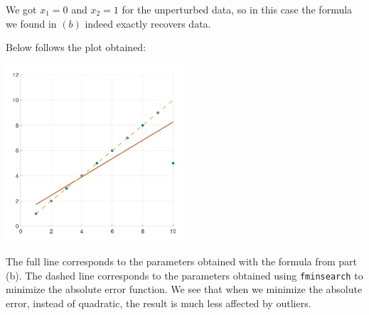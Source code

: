 \documentclass{article}
\begin{document}
We got $x_1 = 0$ and $x_2 = 1$ for the unperturbed data, so in this
case the formula we found in $(b)$ indeed exactly recovers data.

Below follows the plot obtained:
\begin{center}
	\includegraphics[width=0.5\textwidth]{figure3.png}
\end{center}
The full line corresponds to the parameters obtained with the
formula from part (b). The dashed line corresponds to the
parameters obtained using \texttt{fminsearch} to minimize the
absolute error function. We see that when we minimize the absolute
error, instead of quadratic, the result is much less affected
by outliers.
\end{document}
